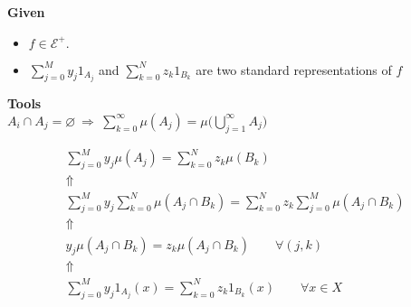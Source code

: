 \documentclass[12pt]{article}
\theoremstyle{theorem}
\theoremstyle{definition}
\theoremstyle{remark}
\newenvironment{given}
{\begin{framed}\textbf{Given}\vspace{0.05in}}
{\end{framed}}
\newenvironment{tools}
{\begin{framed}\textbf{Tools}\vspace{0.05in}}
{\end{framed}}
\begin{document}
\begin{minipage}[t]{0.40\textwidth}

\begin{given}
\begin{itemize}
\item  \(f\in \mathcal{E}^+.\)
\item  \(\sum _{j=0}^My_{j}1_{A_{j}}\) and \(\sum _{k=0}^{N}z_{k}1_{B_{k}}\) are two standard representations of \(f\) 
\end{itemize}
\end{given}

\begin{tools} \\
\(\displaystyle
A_{i}\cap A_{j} = \varnothing \  \Longrightarrow \  \sum _{k=0}^\infty  \mu (A_{j})= \mu \Big(\bigcup _{j=1}^\infty  A_{j}\Big)
\)
\end{tools}

\end{minipage}
\begin{minipage}[t]{0.60\textwidth}
\begin{gather*}
\boxed{\sum _{j=0}^My_{j}\mu (A_{j})=\sum _{k=0}^Nz_{k}\mu (B_{k})} \\
\Uparrow \\
\sum _{j=0}^My_{j} \sum _{k=0}^N\mu (A_{j}\cap B_{k})=\sum _{k=0}^Nz_{k} \sum _{j=0}^M\mu (A_{j}\cap B_{k})\\
\Uparrow  \\
y_{j}\mu (A_{j}\cap B_{k})=z_{k}\mu (A_{j}\cap B_{k}) \qquad \forall (j,k) \\
\Uparrow  \\
\sum _{j=0}^My_{j}1_{A_{j}}(x)=\sum _{k=0}^{N}z_{k}1_{B_{k}}(x) \qquad \forall x\in X
\end{gather*}
\end{minipage}

\noindent\makebox[\linewidth]{\rule{\paperwidth}{0.4pt}}
\end{document}

